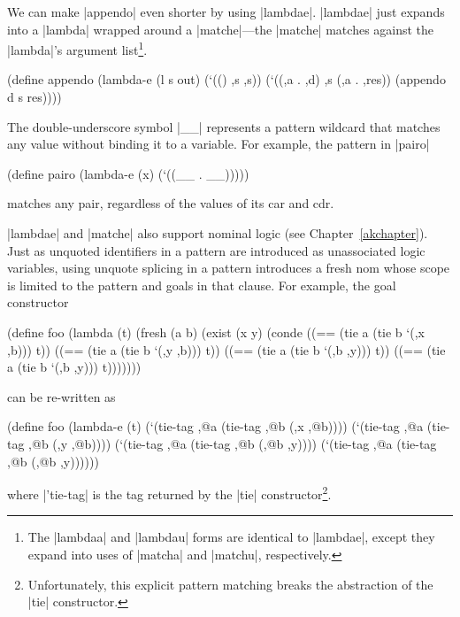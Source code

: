 We can make \scheme|appendo| even shorter by using \scheme|lambdae|.
\scheme|lambdae| just expands into a \scheme|lambda| wrapped around a
\scheme|matche|---the \scheme|matche| matches against the
\scheme|lambda|'s argument list\footnote{The \scheme|lambdaa| and \scheme|lambdau| forms are
  identical to \scheme|lambdae|, except they expand into uses of
  \scheme|matcha| and \scheme|matchu|, respectively.}.

\schemedisplayspace
\begin{schemedisplay}
(define appendo
  (lambda-e (l s out)
    (`(() ,s ,s))
    (`((,a . ,d) ,s (,a . ,res)) (appendo d s res))))
\end{schemedisplay}

The double-underscore symbol \scheme|__| represents a pattern wildcard
that matches any value without binding it to a variable.  For example,
the pattern in \scheme|pairo|

\schemedisplayspace
\begin{schemedisplay}
(define pairo
  (lambda-e (x)
    (`((__ . __)))))
\end{schemedisplay}

\noindent matches any pair, regardless of the values of its car and
cdr.

\scheme|lambdae| and \scheme|matche| also support nominal logic (see
Chapter~\ref{akchapter}).  Just as unquoted identifiers in a pattern
are introduced as unassociated logic variables, using unquote splicing
in a pattern introduces a fresh nom whose scope is limited to the
pattern and goals in that clause.  For example, the goal constructor

\schemedisplayspace
\begin{schemedisplay}
(define foo
  (lambda (t)
    (fresh (a b)
      (exist (x y)
        (conde
          ((== (tie a (tie b `(,x ,b))) t))
          ((== (tie a (tie b `(,y ,b))) t))
          ((== (tie a (tie b `(,b ,y))) t))
          ((== (tie a (tie b `(,b ,y))) t)))))))
\end{schemedisplay}

\noindent can be re-written as

\schemedisplayspace
\begin{schemedisplay}
(define foo
  (lambda-e (t)
    (`(tie-tag ,@a (tie-tag ,@b (,x ,@b))))
    (`(tie-tag ,@a (tie-tag ,@b (,y ,@b))))
    (`(tie-tag ,@a (tie-tag ,@b (,@b ,y))))
    (`(tie-tag ,@a (tie-tag ,@b (,@b ,y))))))
\end{schemedisplay}

\noindent where \scheme|'tie-tag| is the tag returned by the
\scheme|tie| constructor\footnote{Unfortunately, this explicit pattern
matching breaks the abstraction of the \scheme|tie| constructor.}.

